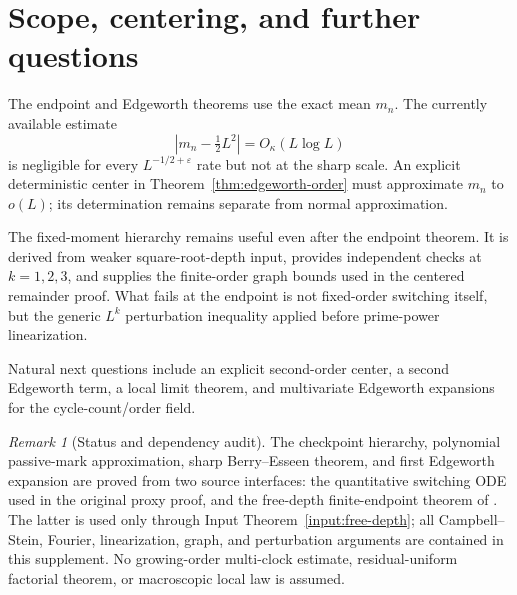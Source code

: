 \documentclass[11pt]{article}
\theoremstyle{remark}
\newtheorem{remark}[theorem]{Remark}
\begin{document}
\section{Scope, centering, and further questions}

The endpoint and Edgeworth theorems use the exact mean $m_n$.  The currently
available estimate
\[
 |m_n-\tfrac12L^2|=O_\kappa(L\log L)
\]
is negligible for every $L^{-1/2+\varepsilon}$ rate but not at the sharp
scale.  An explicit deterministic center in
Theorem~\ref{thm:edgeworth-order} must approximate $m_n$ to $o(L)$; its
determination remains separate from normal approximation.

The fixed-moment hierarchy remains useful even after the endpoint theorem.
It is derived from weaker square-root-depth input, provides independent
checks at $k=1,2,3$, and supplies the finite-order graph bounds used in the
centered remainder proof.  What fails at the endpoint is not fixed-order
switching itself, but the generic $L^k$ perturbation inequality applied
before prime-power linearization.

Natural next questions include an explicit second-order center, a second
Edgeworth term, a local limit theorem, and multivariate Edgeworth expansions
for the cycle-count/order field.

\begin{remark}[Status and dependency audit]
The checkpoint hierarchy, polynomial passive-mark approximation, sharp
Berry--Esseen theorem, and first Edgeworth expansion are proved from two
source interfaces: the quantitative switching ODE used in the original
proxy proof, and the free-depth finite-endpoint theorem of
\cite{LongSwitch2026}.  The latter is used only through
Input Theorem~\ref{input:free-depth}; all Campbell--Stein, Fourier,
linearization, graph, and perturbation arguments are contained in this
supplement.  No growing-order multi-clock estimate, residual-uniform
factorial theorem, or macroscopic local law is assumed.
\end{remark}
\end{document}
